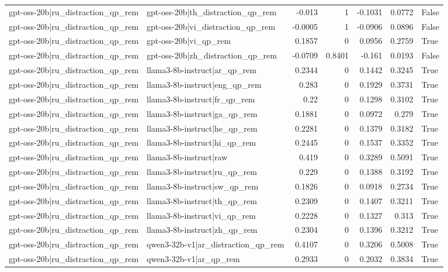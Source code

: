 \begin{table}
\begin{tabular}{l l r r r r l}
gpt-oss-20b|ru_distraction_qp_rem & gpt-oss-20b|th_distraction_qp_rem & -0.013 & 1 & -0.1031 & 0.0772 & False \\
gpt-oss-20b|ru_distraction_qp_rem & gpt-oss-20b|vi_distraction_qp_rem & -0.0005 & 1 & -0.0906 & 0.0896 & False \\
gpt-oss-20b|ru_distraction_qp_rem & gpt-oss-20b|vi_qp_rem & 0.1857 & 0 & 0.0956 & 0.2759 & True \\
gpt-oss-20b|ru_distraction_qp_rem & gpt-oss-20b|zh_distraction_qp_rem & -0.0709 & 0.8401 & -0.161 & 0.0193 & False \\
gpt-oss-20b|ru_distraction_qp_rem & llama3-8b-instruct|ar_qp_rem & 0.2344 & 0 & 0.1442 & 0.3245 & True \\
gpt-oss-20b|ru_distraction_qp_rem & llama3-8b-instruct|eng_qp_rem & 0.283 & 0 & 0.1929 & 0.3731 & True \\
gpt-oss-20b|ru_distraction_qp_rem & llama3-8b-instruct|fr_qp_rem & 0.22 & 0 & 0.1298 & 0.3102 & True \\
gpt-oss-20b|ru_distraction_qp_rem & llama3-8b-instruct|ga_qp_rem & 0.1881 & 0 & 0.0972 & 0.279 & True \\
gpt-oss-20b|ru_distraction_qp_rem & llama3-8b-instruct|he_qp_rem & 0.2281 & 0 & 0.1379 & 0.3182 & True \\
gpt-oss-20b|ru_distraction_qp_rem & llama3-8b-instruct|hi_qp_rem & 0.2445 & 0 & 0.1537 & 0.3352 & True \\
gpt-oss-20b|ru_distraction_qp_rem & llama3-8b-instruct|raw & 0.419 & 0 & 0.3289 & 0.5091 & True \\
gpt-oss-20b|ru_distraction_qp_rem & llama3-8b-instruct|ru_qp_rem & 0.229 & 0 & 0.1388 & 0.3192 & True \\
gpt-oss-20b|ru_distraction_qp_rem & llama3-8b-instruct|sw_qp_rem & 0.1826 & 0 & 0.0918 & 0.2734 & True \\
gpt-oss-20b|ru_distraction_qp_rem & llama3-8b-instruct|th_qp_rem & 0.2309 & 0 & 0.1407 & 0.3211 & True \\
gpt-oss-20b|ru_distraction_qp_rem & llama3-8b-instruct|vi_qp_rem & 0.2228 & 0 & 0.1327 & 0.313 & True \\
gpt-oss-20b|ru_distraction_qp_rem & llama3-8b-instruct|zh_qp_rem & 0.2304 & 0 & 0.1396 & 0.3212 & True \\
gpt-oss-20b|ru_distraction_qp_rem & qwen3-32b-v1|ar_distraction_qp_rem & 0.4107 & 0 & 0.3206 & 0.5008 & True \\
gpt-oss-20b|ru_distraction_qp_rem & qwen3-32b-v1|ar_qp_rem & 0.2933 & 0 & 0.2032 & 0.3834 & True \\

\end{tabular}
\end{table}
